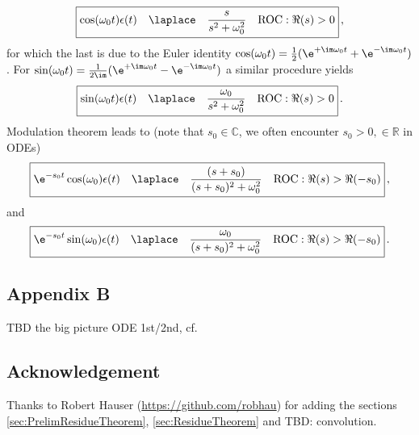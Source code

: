 \begin{align}
\boxed{\cos(\omega_0 t) \epsilon(t)\quad \laplace \quad \frac{s}{s^2 + \omega_0^2}\quad \text{ROC}: \Re(s)>0}\,,
\end{align}
for which the last is due to the Euler identity $\cos(\omega_0 t) = \frac{1}{2} (\e^{+\im \omega_0 t}+\e^{-\im \omega_0 t})$.
%
For $\sin(\omega_0 t) = \frac{1}{2 \im} (\e^{+\im \omega_0 t}-\e^{-\im \omega_0 t})$ a similar
procedure yields
\begin{align}
\boxed{
\sin(\omega_0 t)\epsilon(t)\quad \laplace \quad \frac{\omega_0}{s^2 + \omega_0^2} \quad \text{ROC}: \Re(s)>0}\,.
\end{align}
%
Modulation theorem leads to (note that $s_0 \in \mathbb{C}$, we often encounter $s_0 > 0, \in \mathbb{R}$ in ODEs)
\begin{align}
\boxed{\e^{-s_0 t} \cos(\omega_0) \epsilon(t)\quad \laplace \quad \frac{(s+s_0)}{(s+s_0)^2 + \omega_0^2}\quad \text{ROC}: \Re(s)>\Re(-s_0)}\,,
\end{align}
and
\begin{align}
\boxed{\e^{-s_0 t} \sin(\omega_0) \epsilon(t)\quad \laplace \quad \frac{\omega_0}{(s+s_0)^2 + \omega_0^2}\quad \text{ROC}: \Re(s)>\Re(-s_0)}\,.
\end{align}


\newpage
\subsection*{Appendix B}
TBD the big picture ODE 1st/2nd, cf. \cite[p.117]{Strang2014}

\subsection*{Acknowledgement}
Thanks to Robert Hauser (\url{https://github.com/robhau})
for adding the sections \ref{sec:PrelimResidueTheorem}, \ref{sec:ResidueTheorem} and
TBD: convolution.

% 
% 

